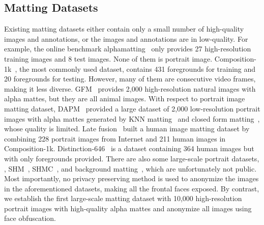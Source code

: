 \documentclass[sigconf]{acmart}
\begin{document}
\subsection{Matting Datasets}
Existing matting datasets either contain only a small number of high-quality images and annotations, or the images and annotations are in low-quality. For example, the online benchmark alphamatting~\cite{TUW-180666} only provides 27 high-resolution training images and 8 test images. None of them is portrait image. Composition-1k~\cite{dim}, the most commonly used dataset, contains 431 foregrounds for training and 20 foregrounds for testing. However, many of them are consecutive video frames, making it less diverse. GFM~\cite{gfm} provides 2,000 high-resolution natural images with alpha mattes, but they are all animal images. With respect to portrait image matting dataset, DAPM~\cite{dapm} provided a large dataset of 2,000 low-resolution portrait images with alpha mattes generated by KNN matting~\cite{chen2013knn} and closed form matting~\cite{levin2007closed}, whose quality is limited. Late fusion~\cite{lf} built a human image matting dataset by combining 228 portrait images from Internet and 211 human images in Composition-1k. Distinction-646~\cite{hatt} is a dataset containing 364 human images but with only foregrounds provided. There are also some large-scale portrait datasets, , SHM~\cite{shm}, SHMC~\cite{shmc}, and background matting~\cite{backgroundmatting, backgroundmattingv2}, which are unfortunately not public. Most importantly, no privacy preserving method is used to anonymize the images in the aforementioned datasets, making all the frontal faces exposed. By contrast, we establish the first large-scale matting dataset with 10,000 high-resolution portrait images with high-quality alpha mattes and anonymize all images using face obfuscation.
\end{document}
